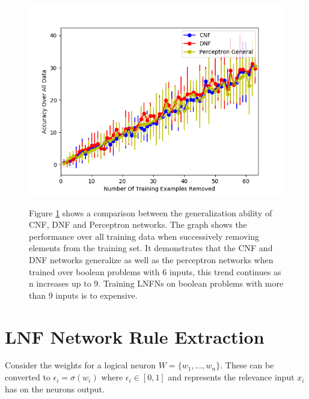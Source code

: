 \begin{figure}[H]
	\centering
	\begin{minipage}[t]{0.6\textwidth}
		\vspace{0px}
		\includegraphics[width=\textwidth]{6-generalization.png}
		\caption{}
		\label{fig:generalization-peformance-6}
	\end{minipage}
	\begin{minipage}[t]{0.39\textwidth}
	\vspace{0px}
		Figure \ref{fig:generalization-peformance-6} shows a comparison between the generalization ability of CNF, DNF and Perceptron networks. The graph shows the performance over all training data when successively removing elements from the training set. It demonstrates that the CNF and DNF networks generalize as well as the perceptron networks when trained over boolean problems with 6 inputs, this trend continues as n increases up to 9. Training LNFNs on boolean problems with more than 9 inputs is to expensive.		
	\end{minipage}
	\hfill
\end{figure}

\section{LNF Network Rule Extraction} \label{sec:lnfn-rule-extraction}
Consider the weights for a logical neuron $W = \{w_1, ..., w_n\}$. These can be converted to $\epsilon_i = \sigma(w_i)$ where $\epsilon_i \in [0, 1]$ and represents the relevance input $x_i$ has on the neurons output.\\

